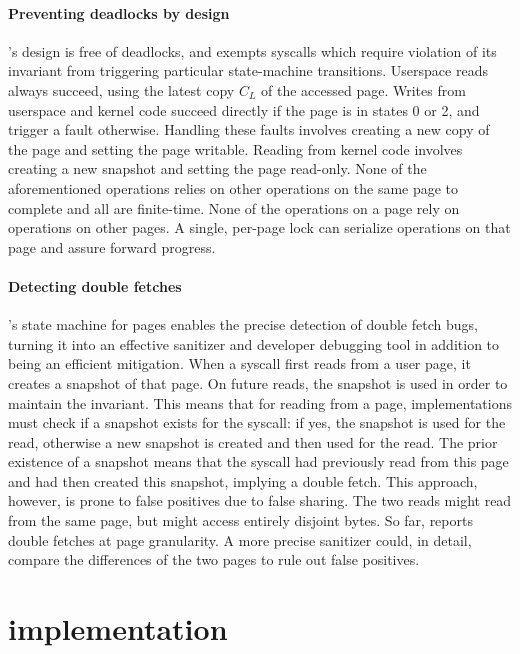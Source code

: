 \documentclass[letterpaper,twocolumn,10pt, anonymous]{article}
\begin{document}
\paragraph{Preventing deadlocks by design}
\tiktok's design is free of deadlocks, and exempts syscalls which 
require violation of its invariant from triggering particular 
state-machine transitions.
Userspace reads always succeed, using the latest copy $C_L$ of the
accessed page.
Writes from userspace and kernel code succeed directly if the 
page is in states 0 or 2, and trigger a fault otherwise.
Handling these faults involves creating a new copy of the page and
setting the page writable. 
Reading from kernel code involves creating a new snapshot and 
setting the page read-only.
None of the aforementioned operations relies on other operations 
on the same page to complete and all are finite-time.
None of the operations on a page rely on operations on other pages.
A single, per-page lock can serialize operations on that page
and assure forward progress.

\paragraph{Detecting double fetches}
\tiktok's state machine for pages enables the precise detection of double fetch
bugs, turning it into an effective sanitizer and developer debugging tool in
addition to being an efficient mitigation.
When a syscall first reads from a user page, it creates a snapshot 
of that page.
On future reads, the snapshot is used in order to maintain the 
invariant.
This means that for reading from a page, implementations must check 
if a snapshot exists for the syscall: if yes, the snapshot is used
for the read, otherwise a new snapshot is created and then used 
for the read. 
The prior existence of a snapshot means that the syscall had previously
read from this page and had then created this snapshot, implying a double 
fetch.
This approach, however, is prone to false positives due to false sharing.
The two reads might read from the same page, but might access entirely 
disjoint bytes.
So far, \tiktok reports double fetches at page granularity. A more precise
sanitizer could, in detail, compare the differences of the two pages to rule out
false positives.


\section{\tiktok implementation}
\label{sec:impl}
\end{document}
